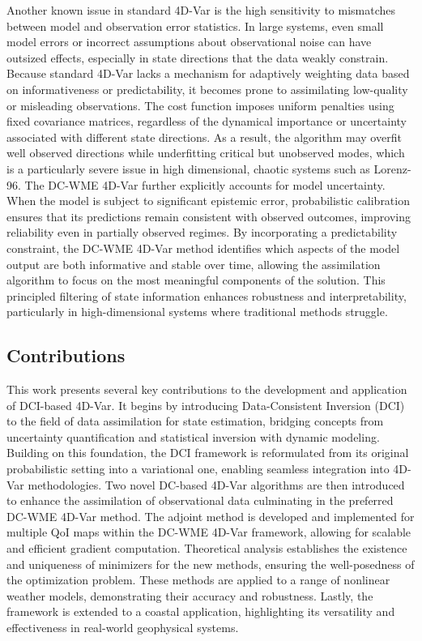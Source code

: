 \documentclass[final,1p,times]{elsarticle}
\begin{document}
Another known issue in standard 4D-Var is the high sensitivity to mismatches between model and observation error statistics. 
In large systems, even small model errors or incorrect assumptions about observational noise can have outsized effects, especially in state directions that the data weakly constrain. 
Because standard 4D-Var lacks a mechanism for adaptively weighting data based on informativeness or predictability, it becomes prone to assimilating low-quality or misleading observations. 
The cost function imposes uniform penalties using fixed covariance matrices, regardless of the dynamical importance or uncertainty associated with different state directions. 
As a result, the algorithm may overfit well observed directions while underfitting critical but unobserved modes, which is a particularly severe issue in high dimensional, chaotic systems such as Lorenz-96. 
The DC-WME 4D-Var further explicitly accounts for model uncertainty. 
When the model is subject to significant epistemic error, probabilistic calibration ensures that its predictions remain consistent with observed outcomes, improving reliability even in partially observed regimes. 
By incorporating a predictability constraint, the DC-WME 4D-Var method identifies which aspects of the model output are both informative and stable over time, allowing the assimilation algorithm to focus on the most meaningful components of the solution. 
This principled filtering of state information enhances robustness and interpretability, particularly in high-dimensional systems where traditional methods struggle.

\subsection{Contributions}

This work presents several key contributions to the development and application of DCI-based 4D-Var. 
It begins by introducing Data-Consistent Inversion (DCI) to the field of data assimilation for state estimation, bridging concepts from uncertainty quantification and statistical inversion with dynamic modeling. 
Building on this foundation, the DCI framework is reformulated from its original probabilistic setting into a variational one, enabling seamless integration into 4D-Var methodologies. 
Two novel DC-based 4D-Var algorithms are then introduced to enhance the assimilation of observational data culminating in the preferred DC-WME 4D-Var method. 
The adjoint method is developed and implemented for multiple QoI maps within the DC-WME 4D-Var framework, allowing for scalable and efficient gradient computation. 
Theoretical analysis establishes the existence and uniqueness of minimizers for the new methods, ensuring the well-posedness of the optimization problem. 
These methods are applied to a range of nonlinear weather models, demonstrating their accuracy and robustness. 
Lastly, the framework is extended to a coastal application, highlighting its versatility and effectiveness in real-world geophysical systems.
\end{document}
